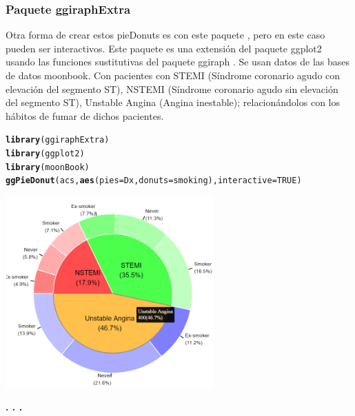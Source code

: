 \documentclass{article}\usepackage[]{graphicx}\usepackage[]{color}
\makeatletter
\newcommand{\hlnum}[1]{\textcolor[rgb]{0.686,0.059,0.569}{#1}}%
\newcommand{\hlstd}[1]{\textcolor[rgb]{0.345,0.345,0.345}{#1}}%
\newcommand{\hlkwc}[1]{\textcolor[rgb]{0.333,0.667,0.333}{#1}}%
\newcommand{\hlkwd}[1]{\textcolor[rgb]{0.737,0.353,0.396}{\textbf{#1}}}%
\newenvironment{kframe}{%
 \def\at@end@of@kframe{}%
 \ifinner\ifhmode%
  \def\at@end@of@kframe{\end{minipage}}%
  \begin{minipage}{\columnwidth}%
 \fi\fi%
 \def\FrameCommand##1{\hskip\@totalleftmargin \hskip-\fboxsep
 \colorbox{shadecolor}{##1}\hskip-\fboxsep
     \hskip-\linewidth \hskip-\@totalleftmargin \hskip\columnwidth}%
 \MakeFramed {\advance\hsize-\width
   \@totalleftmargin\z@ \linewidth\hsize
   \@setminipage}}%
 {\par\unskip\endMakeFramed%
 \at@end@of@kframe}
\newenvironment{knitrout}{}{} %
\makeatother
\begin{document}
\subsubsection{Paquete ggiraphExtra}
Otra forma de crear estos pieDonuts es con este paquete %
, pero en este caso pueden ser interactivos. Este paquete es una extensi\'on del paquete ggplot2 %
usando las funciones sustitutivas del paquete ggiraph %
.
Se usan datos de las bases de datos moonbook. Con pacientes con STEMI (S\'indrome coronario agudo con elevaci\'on del segmento ST), NSTEMI (S\'indrome coronario agudo sin elevaci\'on del segmento ST), Unstable Angina (Angina inestable); relacion\'andolos con los h\'abitos de fumar de dichos pacientes.
\begin{knitrout}
\color{fgcolor}\begin{kframe}
\begin{alltt}
\hlkwd{library}\hlstd{(ggiraphExtra)}
\hlkwd{library}\hlstd{(ggplot2)}
\hlkwd{library}\hlstd{(moonBook)}
\hlkwd{ggPieDonut}\hlstd{(acs,}\hlkwd{aes}\hlstd{(}\hlkwc{pies}\hlstd{=Dx,}\hlkwc{donuts}\hlstd{=smoking),} \hlkwc{interactive} \hlstd{=} \hlnum{TRUE}\hlstd{)}
\end{alltt}
\end{kframe}
\end{knitrout}
\vbox{
    \centering
    \includegraphics[width=0.6\textwidth]{imag/pieDonut_inte}
}
\begin{center}
\textbf{. . .}
\end{center}
\end{document}
